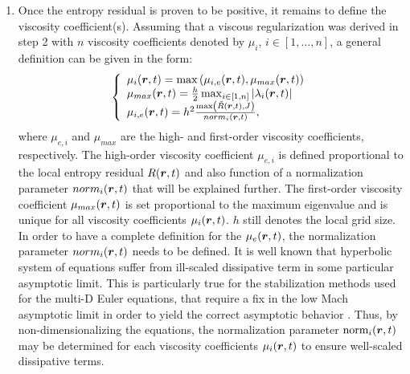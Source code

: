 \begin{enumerate}
\item Once the entropy residual is proven to be positive, it remains to define the viscosity coefficient(s). Assuming that a viscous regularization was derived in step 2 with $n$ viscosity coefficients denoted by $\mu_i$, $i\in \left[1, \dots, n\right]$, a general definition can be given in the form:
%
\begin{equation}
\left\{
\begin{array}{l}
\mu_i(\boldsymbol r,t) = \max \left( \mu_{i,e}(\boldsymbol r,t), \mu_{max}(\boldsymbol r,t) \right) \nonumber \\
\mu_{max}(\boldsymbol r,t) = \frac{h}{2} \max_{i\in \left[1,n\right]} |\lambda_i(\boldsymbol r,t)| \nonumber \\
\mu_{i,e}(\boldsymbol r,t) = h^2 \frac{\max\left(\tilde{R}(\boldsymbol r,t), J\right)}{norm_i(\boldsymbol r,t)}, \nonumber
\end{array}
\right.
\end{equation}
%
where $\mu_{e,i}$ and $\mu_{max}$ are the high- and first-order viscosity coefficients, respectively. The high-order viscosity coefficient $\mu_{e,i}$ is defined proportional to the local entropy residual $R(\boldsymbol r,t)$ and also function of a normalization parameter $norm_i(\boldsymbol r,t)$ that will be explained further. The first-order viscosity coefficient $\mu_{max}(\boldsymbol r,t)$ is set proportional to the maximum eigenvalue and is unique for all viscosity coefficients $\mu_i(\boldsymbol r,t)$. $h$ still denotes the local grid size. In order to have a complete definition for the $\mu_e(\boldsymbol r,t)$, the normalization parameter $norm_i(\boldsymbol r,t)$ needs to be defined. It is well known that hyperbolic system of equations suffer from ill-scaled dissipative term in some particular asymptotic limit. This is particularly true for the stabilization methods used for the multi-D Euler equations, that require a fix in the low Mach asymptotic limit in order to yield the correct asymptotic behavior \cite{LowMach1, LowMach2}. Thus, by non-dimensionalizing the equations, the normalization parameter $\textrm{norm}_i(\boldsymbol r,t)$ may be determined for each viscosity coefficients $\mu_i(\boldsymbol r,t)$ to ensure well-scaled dissipative terms. 
\end{enumerate}
